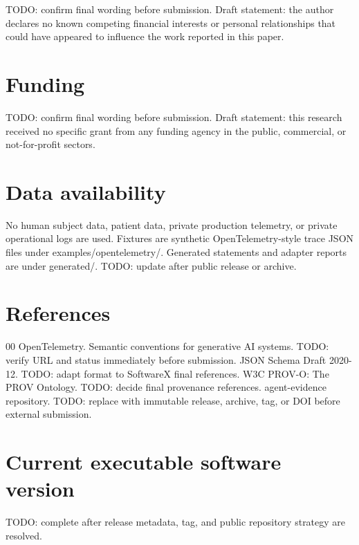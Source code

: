 \documentclass[preprint,12pt,a4paper]{elsarticle}
\begin{document}
TODO: confirm final wording before submission. Draft statement: the author
declares no known competing financial interests or personal relationships that
could have appeared to influence the work reported in this paper.

\section*{Funding}

TODO: confirm final wording before submission. Draft statement: this research
received no specific grant from any funding agency in the public, commercial, or
not-for-profit sectors.

\section*{Data availability}

No human subject data, patient data, private production telemetry, or private
operational logs are used. Fixtures are synthetic OpenTelemetry-style trace JSON
files under examples/opentelemetry/. Generated statements and adapter reports
are under generated/. TODO: update after public release or archive.

\section*{References}

\begin{thebibliography}{00}
 OpenTelemetry. Semantic conventions for generative AI systems. TODO: verify URL and status immediately before submission.
 JSON Schema Draft 2020-12. TODO: adapt format to SoftwareX final references.
 W3C PROV-O: The PROV Ontology. TODO: decide final provenance references.
 agent-evidence repository. TODO: replace with immutable release, archive, tag, or DOI before external submission.
\end{thebibliography}

\section*{Current executable software version}

TODO: complete after release metadata, tag, and public repository strategy are resolved.
\end{document}
